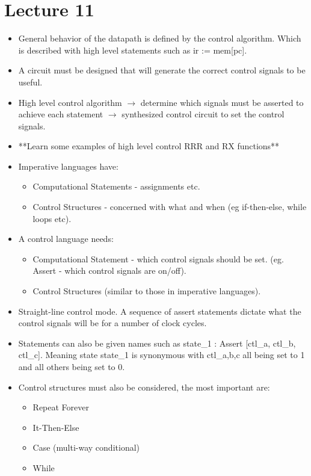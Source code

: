 \documentclass{article}
\begin{document}
\section*{Lecture 11}
\begin{itemize}
\item General behavior of the datapath is defined by the control algorithm. Which is described with high level statements such as ir := mem[pc].
\item A circuit must be designed that will generate the correct control signals to be useful.
\item High level control algorithm $\rightarrow$ determine which signals must be asserted to achieve each statement $\rightarrow$ synthesized control circuit to set the control signals.
\item **Learn some examples of high level control RRR and RX functions**
\item Imperative languages have:
\begin{itemize}
\item Computational Statements - assignments etc.
\item Control Structures - concerned with what and when (eg if-then-else, while loops etc).
\end{itemize}
\item A control language needs:
\begin{itemize}
\item Computational Statement - which control signals should be set. (eg. Assert - which control signals are on/off).
\item Control Structures (similar to those in imperative languages).
\end{itemize}
\item Straight-line control mode. A sequence of assert statements dictate what the control signals will be for a number of clock cycles.
\item Statements can also be given names such as state\_1 : Assert [ctl\_a, ctl\_b, ctl\_c]. Meaning state state\_1 is synonymous with ctl\_a,b,c all being set to 1 and all others being set to 0.
\item Control structures must also be considered, the most important are:
\begin{itemize}
\item Repeat Forever
\item It-Then-Else
\item Case (multi-way conditional)
\item While
\end{itemize}

\end{itemize}
\end{document}

